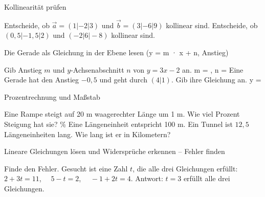 \begin{aufgabe}{Kollinearität prüfen}
\begin{teile}
\teil Entscheide, ob $\vec a = (1 | -2 | 3)$ und $\vec b = (3 | -6 | 9)$ kollinear sind.
\teil Entscheide, ob $(0{,}5 | -1{,}5 | 2)$ und $(-2 | 6 | -8)$ kollinear sind.
\end{teile}
\end{aufgabe}

\begin{aufgabe}{Die Gerade als Gleichung in der Ebene lesen (y = m · x + n, Anstieg)}
\begin{teile}
\teil Gib Anstieg $m$ und $y$-Achsenabschnitt $n$ von $y = 3x - 2$ an. m = \leerfeld , n = \leerfeld
\teil Eine Gerade hat den Anstieg $-0{,}5$ und geht durch $(4 | 1)$. Gib ihre Gleichung an. y = \leerfeld
\end{teile}
\end{aufgabe}

\begin{aufgabe}{Prozentrechnung und Maßstab}
\begin{teile}
\teil Eine Rampe steigt auf 20 m waagerechter Länge um 1 m. Wie viel Prozent Steigung hat sie? \leerfeld \%
\teil Eine Längeneinheit entspricht 100 m. Ein Tunnel ist $12{,}5$ Längeneinheiten lang. Wie lang ist er in Kilometern? \leerfeld[km]
\end{teile}
\end{aufgabe}

\begin{aufgabe}{Lineare Gleichungen lösen und Widersprüche erkennen – Fehler finden}
\begin{teile}
\teil Finde den Fehler. Gesucht ist eine Zahl $t$, die alle drei Gleichungen erfüllt: $2 + 3t = 11$, $\quad 5 - t = 2$, $\quad -1 + 2t = 4$.  Antwort: $t = 3$ erfüllt alle drei Gleichungen.
\end{teile}
\end{aufgabe}

